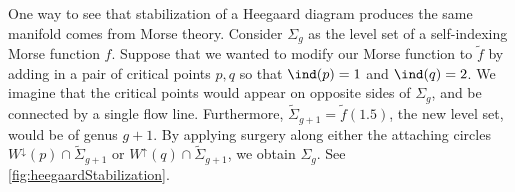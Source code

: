 
One way to see that stabilization of a Heegaard diagram produces the same manifold comes from Morse theory. Consider $\Sigma_g$ as the level set of a self-indexing Morse function $f$. Suppose that we wanted to modify our Morse function to $\tilde f$ by adding in a pair of critical points $p, q$ so that $\ind(p)=1$ and $\ind(q)=2$. We imagine that the critical points would appear on opposite sides of $\Sigma_g$, and be connected by a single flow line. Furthermore, $\tilde \Sigma_{g+1}=\tilde f(1.5)$, the new level set, would be of genus $g+1$. By applying surgery along either the attaching circles $W^\downarrow(p)\cap \tilde \Sigma_{g+1}$ or $W^\uparrow(q)\cap \tilde \Sigma_{g+1}$, we obtain $\Sigma_g$. See \cref{fig:heegaardStabilization}.

